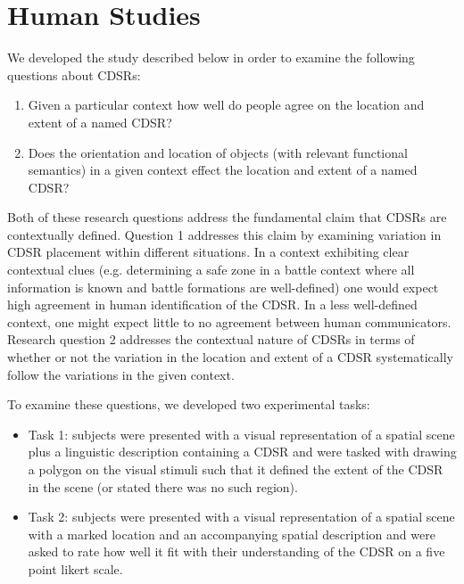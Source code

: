 \documentclass[11pt,letterpaper]{article}
\begin{document}
\section{Human Studies}

We developed the study described below in order to examine the following questions about CDSRs:
\begin{enumerate}
	\item Given a particular context how well do people agree on the location and extent of a named CDSR?
	\item Does the orientation and location of objects (with relevant functional semantics) in a given context effect the location and extent of a named CDSR?
\end{enumerate}

Both of these research questions address the fundamental claim that CDSRs are contextually defined. Question 1 addresses this claim by examining variation in CDSR placement within different situations. In a context exhibiting clear contextual clues (e.g. determining a safe zone in a battle context where all information is known and battle formations are well-defined) one would expect high agreement in human identification of the CDSR. In a less well-defined context, one might expect little to no agreement between human communicators.  Research question 2 addresses the contextual nature of CDSRs in terms of whether or not the variation in the location and extent of a CDSR systematically follow the variations  in the given context. 


To examine these questions, we developed two experimental tasks:
\begin{itemize}
	\item{Task 1:} subjects were presented with a visual representation of a spatial scene plus a linguistic description containing a CDSR and were tasked with drawing a polygon on the visual stimuli such that it defined the extent of the CDSR in the scene (or stated there was no such region).
	\item{Task 2:} subjects were presented with a visual representation of a spatial scene with a marked location and an accompanying spatial description and were asked to rate how well it fit with their understanding of the CDSR on a five point likert scale.
\end{itemize}
\end{document}

